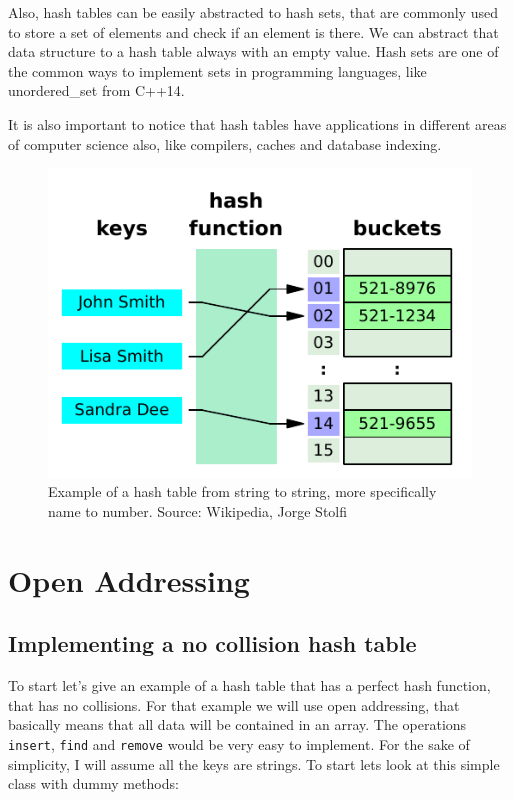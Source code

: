 \newpage

Also, hash tables can be easily abstracted to hash sets, that are commonly used to store a set of elements and check if an element is there. We can abstract that data structure to a hash table always with an empty value. Hash sets are one of the common ways to implement sets in programming languages, like unordered\_set from C++14.

It is also important to notice that hash tables have applications in different areas of computer science also, like compilers, caches and database indexing.


\begin{figure}[h!]
  \centering
  \includegraphics[width=12cm]{figuras/hash-table.pdf}
  \caption{Example of a hash table from string to string, more specifically name to number. Source: Wikipedia, Jorge Stolfi }
\end{figure}


\newpage 
\section{Open Addressing}

\subsection{Implementing a no collision hash table}

To start let's give an example of a hash table that has a perfect hash function, that has no collisions. For that example we will use open addressing, that basically means that all data will be contained in an array. The operations \texttt{insert}, \texttt{find} and \texttt{remove} would be very easy to implement. For the sake of simplicity, I will assume all the keys are strings. To start lets look at this simple class with dummy methods:

